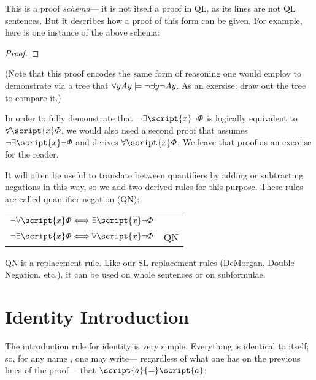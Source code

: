 This is a proof \emph{schema}--- it is not itself a proof in QL, as its lines are not QL sentences. But it describes how a proof of this form can be given. For example, here is one instance of the above schema:


\begin{proof}
	 
	\open
		\open
			\open
			\close
		\close
	\close
\end{proof}

(Note that this proof encodes the same form of reasoning one would employ to demonstrate via a tree that $\forall y Ay \models \neg \exists y \neg Ay$. As an exersise: draw out the tree to compare it.)

In order to fully demonstrate that $\enot\exists \script{x}\enot\metaA{}$ is logically equivalent to $\forall \script{x}\metaA{}$, we would also need a second proof that assumes $\enot\exists \script{x}\enot\metaA{}$ and derives $\forall \script{x}\metaA{}$. We leave that proof as an exercise for the reader.

It will often be useful to translate between quantifiers by adding or subtracting negations in this way, so we add two derived rules for this purpose. These rules are called quantifier negation (QN):
\begin{center}
\begin{tabular}{rl}
$\enot\forall\script{x}\metaA{} \Longleftrightarrow \exists\script{x}\enot\metaA{}$\\
$\enot\exists\script{x}\metaA{} \Longleftrightarrow \forall\script{x}\enot\metaA{}$
& QN
\end{tabular}
\end{center}
QN is a replacement rule. Like our SL replacement rules (DeMorgan, Double Negation, etc.), it can be used on whole sentences or on subformulae.

\section{Identity Introduction}

The introduction rule for identity is very simple. Everything is identical to itself; so, for any name , one may write--- regardless of what one has on the previous lines of the proof--- that $\script{a}{=}\script{a}$:

